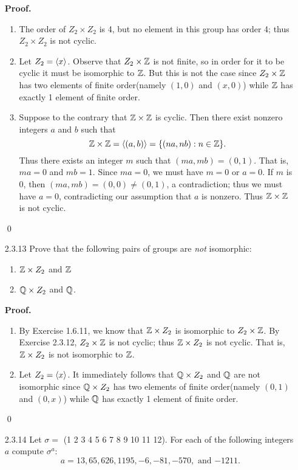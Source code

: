 \begin{enumerate}
      \textbf{Proof.}
      \begin{enumerate}
         \item The order of $Z_2 \times Z_2$ is 4, but no element in this group
               has order 4; thus $Z_2 \times Z_2$ is not cyclic.
         \item Let $Z_2 = \langle x \rangle$. Observe that $Z_2 \times \mathbb{Z}$ is not finite,
               so in order for it to be cyclic it must be isomorphic to $\mathbb{Z}$.
               But this is not the case since $Z_2 \times \mathbb{Z}$ has two elements
               of finite order(namely $(1, 0)$ and $(x, 0)$) while $\mathbb{Z}$ has
               exactly 1 element of finite order.
         \item Suppose to the contrary that $\mathbb{Z} \times \mathbb{Z}$ is cyclic. Then there
               exist nonzero integers $a$ and $b$ such that
               $$\mathbb{Z} \times \mathbb{Z} = \langle (a,b) \rangle = \{(na, nb) : n \in \mathbb{Z}\}.$$
               Thus there exists an integer $m$ such that
               $(ma, mb) = (0, 1)$. That is, $ma = 0$ and $mb = 1$. Since
               $ma = 0$, we must have $m = 0$ or $a = 0$. If $m$ is 0, then
               $(ma, mb) = (0, 0) \neq (0, 1)$, a contradiction; thus we must
               have $a = 0$, contradicting our assumption that $a$ is nonzero.
               Thus $\mathbb{Z} \times \mathbb{Z}$ is not cyclic.
      \end{enumerate} \qed
   \item[2.3.13]  Prove that the following pairs of groups are \textit{not}
                  isomorphic:
                  \begin{enumerate}
                     \item $\mathbb{Z} \times Z_2$ and $\mathbb{Z}$
                     \item $\mathbb{Q} \times Z_2$ and $\mathbb{Q}$.
                  \end{enumerate}
      
      \textbf{Proof.}
      \begin{enumerate}
         \item By Exercise 1.6.11, we know that $\mathbb{Z} \times Z_2$ is isomorphic to
               $Z_2 \times \mathbb{Z}$. By Exercise 2.3.12, $Z_2 \times \mathbb{Z}$ is not
               cyclic; thus $\mathbb{Z} \times Z_2$ is not cyclic. That is,
               $\mathbb{Z} \times Z_2$ is not isomorphic to $\mathbb{Z}$.
         \item Let $Z_2 = \langle x \rangle$. It immediately follows that
               $\mathbb{Q} \times Z_2$ and $\mathbb{Q}$ are not isomorphic since $\mathbb{Q} \times Z_2$
               has two elements of finite order(namely $(0, 1)$ and $(0, x)$)
               while $\mathbb{Q}$ has exactly 1 element of finite order.
      \end{enumerate} \qed
   \item[2.3.14]  Let $\sigma =$ (1 2 3 4 5 6 7 8 9 10 11 12). For each of the
                  following integers $a$ compute $\sigma^a$:
                  $$a = 13, 65, 626, 1195, -6, -81, -570,\text{ and } {-1211}.$$
                  

\end{enumerate}
